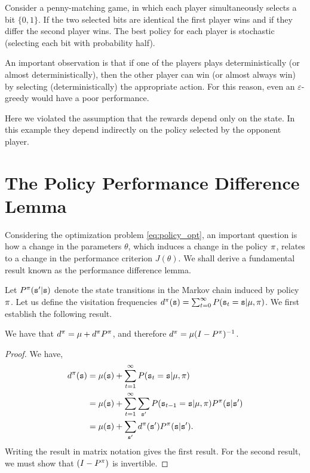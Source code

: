 
Consider a penny-matching game, in which each player simultaneously
selects a bit $\{0,1\}$. If the two selected bits are identical the
first player wins and if they differ the second player wins. The
best policy for each player is stochastic (selecting each bit with
probability half).

An important observation is that if one of the players plays
deterministically (or almost deterministically), then the other
player can win (or almost always win) by selecting
(deterministically) the appropriate action. For this reason, even
an $\varepsilon$-greedy would have a poor performance.

Here we violated the assumption that the rewards depend only on the
state. In this example they depend indirectly on the policy selected by the opponent player.

\section{The Policy Performance Difference Lemma}

Considering the optimization problem \eqref{eq:policy_opt}, an important question is how a change in the parameters $\theta$, which induces a change in the policy $\pi$, relates to a change in the performance criterion $J(\theta)$. We shall derive a fundamental result known as the performance difference lemma.

Let $P^{\pi}({\tt s}' | {\tt s})$ denote the state transitions in the Markov chain induced by policy $\pi$. Let us define the visitation frequencies $d^{\pi}({\tt s}) = \sum_{t=0}^\infty P({\tt s}_t = {\tt s} | \mu, \pi)$. We first establish the following result.
\begin{proposition}\label{prop:visitation_freq}
    We have that $d^{\pi} = \mu + d^{\pi} P^{\pi}$, and therefore $d^{\pi} = \mu (I - P^{\pi})^{-1}$.
\end{proposition}
\begin{proof}
We have,
\begin{equation*}
\begin{split}
        d^{\pi}({\tt s}) &= \mu({\tt s}) + \sum_{t=1}^\infty P({\tt s}_t = {\tt s} | \mu, \pi) \\
        &= \mu({\tt s}) + \sum_{t=1}^\infty \sum_{{\tt s}'} P({\tt s}_{t-1} = {\tt s} | \mu, \pi) P^{\pi}({\tt s} | {\tt s}')\\
        &= \mu({\tt s}) + \sum_{{\tt s}'} d^{\pi}({\tt s}')P^{\pi}({\tt s} | {\tt s}').
\end{split}
\end{equation*}
Writing the result in matrix notation gives the first result. For the second result, we must show that $(I - P^{\pi})$ is invertible. 
\end{proof}

